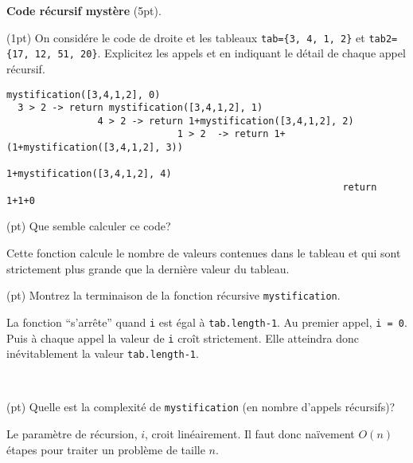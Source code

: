\documentclass[10pt]{article}\usepackage[correction,nu]{esial}
\begin{document}
\bigskip\Exercice\textbf{Code récursif mystère} (5pt). 

\noindent\begin{minipage}{.56\linewidth}

  \Question(1pt) On considére le code de droite et les tableaux
  \texttt{tab=\{3, 4, 1, 2\}} et \texttt{tab2=\{17, 12, 51, 20\}}.  Explicitez
  les appels  et
   en indiquant le détail de chaque appel
  récursif.

\begin{Reponse}
\begin{verbatim}
mystification([3,4,1,2], 0)
  3 > 2 -> return mystification([3,4,1,2], 1)
                4 > 2 -> return 1+mystification([3,4,1,2], 2)   
                              1 > 2  -> return 1+(1+mystification([3,4,1,2], 3))    
                                              1+mystification([3,4,1,2], 4)
                                                           return 1+1+0       
\end{verbatim}
\end{Reponse}

\Question(\textonehalf pt) Que semble calculer ce code?
\begin{Reponse}
Cette fonction calcule le nombre de valeurs contenues dans le tableau et qui
sont strictement plus grande que la dernière valeur du tableau. 
\end{Reponse}

\Question(\textonehalf pt) Montrez la terminaison de la fonction récursive
\texttt{mystification}.
\begin{Reponse}
La fonction ``s'arrête'' quand \texttt{i} est égal à \texttt{tab.length-1}.
Au premier appel, \texttt{i = 0}. Puis à chaque appel la valeur de \texttt{i}
croît strictement. Elle atteindra donc inévitablement la valeur
\texttt{tab.length-1}. 
\end{Reponse}

  
\end{minipage}~\begin{minipage}{.44\linewidth}
\end{minipage}



\Question(\textonehalf pt) Quelle est la complexité  de
\texttt{mystification} (en nombre d'appels récursifs)? 
\begin{Reponse}
  Le paramètre de récursion, $i$, croit linéairement. Il faut donc naïvement
  $O(n)$ étapes pour traiter un problème de taille $n$.
\end{Reponse}
\end{document}
